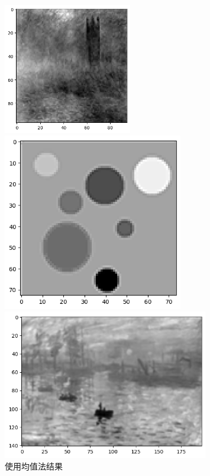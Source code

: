 \documentclass{article}
\begin{document}
\begin{figure}[htbp]
	\centering
		\begin{minipage}[c]{0.3\textwidth} %
			\centering
			\includegraphics[width=0.5\textwidth]{output11.png} %
			
		\end{minipage}%
		\begin{minipage}[c]{0.2\textwidth}
			\centering
			\includegraphics[width=0.7\textwidth]{output12.png}
			
		\end{minipage}
		\begin{minipage}[c]{0.2\textwidth}
			\centering
			\includegraphics[width=0.8\textwidth]{output13.png}
	
		\end{minipage}
		\caption*{使用均值法结果}
\end{figure}
\end{document}
